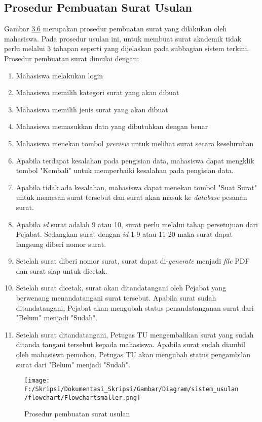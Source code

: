 \subsection{Prosedur Pembuatan Surat Usulan}
\label{sec:pembuatan_surat_usulan}
Gambar \hyperlink{pembuatan_usulan}{3.6} merupakan prosedur pembuatan surat yang dilakukan oleh mahasiswa. Pada prosedur usulan ini, untuk membuat surat akademik tidak perlu melalui 3 tahapan seperti yang dijelaskan pada subbagian sistem terkini. Prosedur pembuatan surat dimulai dengan:
\begin{enumerate}
	\item Mahasiswa melakukan login
	\item Mahasiswa memilih kategori surat yang akan dibuat
	\item Mahasiswa memilih jenis surat yang akan dibuat
	\item Mahasiswa memasukkan data yang dibutuhkan dengan benar
	\item Mahasiswa menekan tombol \textit{preview} untuk melihat surat secara keseluruhan
	\item Apabila terdapat kesalahan pada pengisian data, mahasiswa dapat mengklik tombol "Kembali" untuk memperbaiki kesalahan pada pengisian data.
	\item Apabila tidak ada kesalahan, mahasiswa dapat menekan tombol "Suat Surat" untuk memesan surat tersebut dan surat akan masuk ke \textit{database} pesanan surat.
	\item Apabila \textit{id} surat adalah 9 atau 10, surat perlu melalui tahap persetujuan dari Pejabat. Sedangkan surat dengan \textit{id} 1-9 atau 11-20 maka surat dapat langsung diberi nomor surat.
	\item Setelah surat diberi nomor surat, surat dapat di-\textit{generate} menjadi \textit{file} PDF dan surat siap untuk dicetak.	
	\item Setelah surat dicetak, surat akan ditandatangani oleh Pejabat yang berwenang menandatangani surat tersebut. Apabila surat sudah ditandatangani, Pejabat akan mengubah status penandatanganan surat dari "Belum" menjadi "Sudah".
	\item Setelah surat ditandatangani, Petugas TU mengembalikan surat yang sudah ditanda tangani tersebut kepada mahasiswa. Apabila surat sudah diambil oleh mahasiswa pemohon, Petugas TU akan mengubah status pengambilan surat dari "Belum" menjadi "Sudah".
	\
\end{enumerate}
\begin{figure}[H]
	\centering
		\texttt{[image: F:/Skripsi/Dokumentasi\_Skripsi/Gambar/Diagram/sistem\_usulan/flowchart/Flowchartsmaller.png]}
	{\caption{Prosedur pembuatan surat usulan}}
	\label{fig:pembuatan_usulan}
\end{figure}

